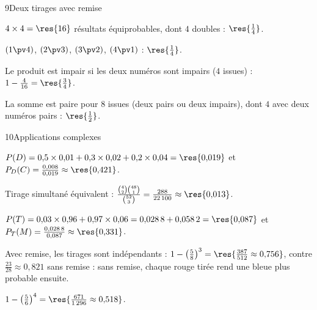 \begin{corrige}{9}{Deux tirages avec remise}
\begin{questions}
  \item $4\times4=\res{16}$ résultats équiprobables, dont $4$ doubles : $\res{\frac14}$.
  \item $(1\pv4)$, $(2\pv3)$, $(3\pv2)$, $(4\pv1)$ : $\res{\frac14}$.
  \item Le produit est impair si les deux numéros sont impairs ($4$ issues) : $1-\frac{4}{16}=\res{\frac34}$.
  \item La somme est paire pour $8$ issues (deux pairs ou deux impairs), dont $4$ avec deux numéros pairs : $\res{\frac12}$.
\end{questions}
\end{corrige}

\begin{corrige}{10}{Applications complexes}
\begin{questions}
  \item $P(D)=0{,}5\times0{,}01+0{,}3\times0{,}02+0{,}2\times0{,}04=\res{0{,}019}$ et $P_D(C)=\frac{0{,}008}{0{,}019}\approx\res{0{,}421}$.
  \item Tirage simultané équivalent : $\frac{\binom42\binom{48}1}{\binom{52}3}=\frac{288}{22\,100}\approx\res{0{,}013}$.
  \item $P(T)=0{,}03\times0{,}96+0{,}97\times0{,}06=0{,}028\,8+0{,}058\,2=\res{0{,}087}$ et $P_T(M)=\frac{0{,}028\,8}{0{,}087}\approx\res{0{,}331}$.
  \item Avec remise, les tirages sont indépendants : $1-\left(\frac58\right)^{3}=\res{\frac{387}{512}\approx0{,}756}$, contre
    $\frac{23}{28}\approx0{,}821$ sans remise : sans remise, chaque rouge tirée rend une bleue plus probable ensuite.
  \item $1-\left(\frac56\right)^{4}=\res{\frac{671}{1\,296}\approx0{,}518}$.
\end{questions}
\end{corrige}

